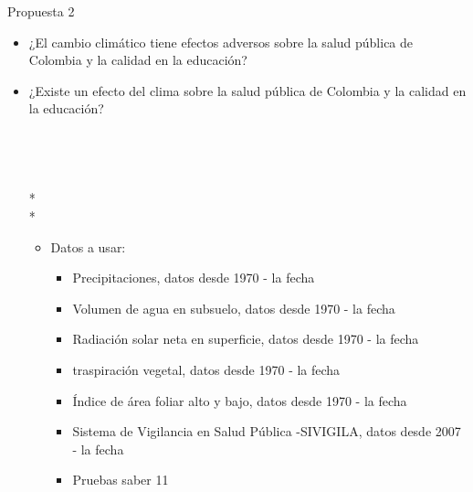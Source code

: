 \documentclass[9pt]{beamer}
\begin{document}
\begin{frame}{Propuesta 2}
\begin{itemize}
\item[] ¿El cambio climático tiene efectos adversos sobre la salud pública de Colombia y la calidad en la educación?
\item[] ¿Existe un efecto del clima sobre la salud pública de Colombia y la calidad en la educación?\\~\\

\\~\\
\\*
\\*
\begin{itemize}
\item []

 Datos a usar:
\begin{itemize}
\item Precipitaciones, datos desde 1970 - la fecha
\item Volumen de agua en subsuelo, datos desde 1970 - la fecha
\item Radiación solar neta en superficie, datos desde 1970 - la fecha
\item traspiración vegetal, datos desde 1970 - la fecha
\item Índice de área foliar alto y bajo, datos desde 1970 - la fecha
 
\item Sistema de Vigilancia en Salud Pública -SIVIGILA, datos desde 2007 - la fecha
\item Pruebas saber 11
\end{itemize}
\end{itemize}
\end{itemize}
\end{frame}
\end{document}
